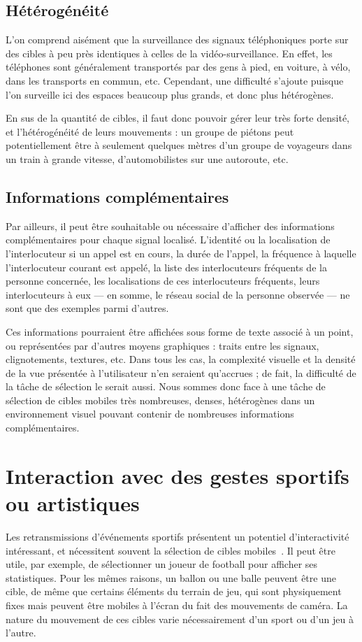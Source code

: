 	\FloatBarrier \subsection{Hétérogénéité}
	L'on comprend aisément que la surveillance des signaux téléphoniques porte sur des cibles à peu près identiques à celles de la vidéo-surveillance. En effet, les téléphones sont généralement transportés par des gens à pied, en voiture, à vélo, dans les transports en commun, etc. Cependant, une difficulté s'ajoute puisque l'on surveille ici des espaces beaucoup plus grands, et donc plus hétérogènes.
	
	En sus de la quantité de cibles, il faut donc pouvoir gérer leur très forte densité, et l'hétérogénéité de leurs mouvements : un groupe de piétons peut potentiellement être à seulement quelques mètres d'un groupe de voyageurs dans un train à grande vitesse, d'automobilistes sur une autoroute, etc.
	
	\FloatBarrier \subsection{Informations complémentaires}
	Par ailleurs, il peut être souhaitable ou nécessaire d'afficher des informations complémentaires pour chaque signal localisé. L'identité ou la localisation de l'interlocuteur si un appel est en cours, la durée de l'appel, la fréquence à laquelle l'interlocuteur courant est appelé, la liste des interlocuteurs fréquents de la personne concernée, les localisations de ces interlocuteurs fréquents, leurs interlocuteurs à eux — en somme, le réseau social de la personne observée — ne sont que des exemples parmi d'autres.
	
	Ces informations pourraient être affichées sous forme de texte associé à un point, ou représentées par d'autres moyens graphiques : traits entre les signaux, clignotements, textures, etc. Dans tous les cas, la complexité visuelle et la densité de la vue présentée à l'utilisateur n'en seraient qu'accrues ; de fait, la difficulté de la tâche de sélection le serait aussi. Nous sommes donc face à une tâche de sélection de cibles mobiles très nombreuses, denses, hétérogènes dans un environnement visuel pouvant contenir de nombreuses informations complémentaires.
	
	\section{Interaction avec des gestes sportifs ou artistiques}	
	Les retransmissions d'événements sportifs présentent un potentiel d'interactivité intéressant, et nécessitent souvent la sélection de cibles mobiles~\cite{ilich2010moving}. Il peut être utile, par exemple, de sélectionner un joueur de football pour afficher ses statistiques. Pour les mêmes raisons, un ballon ou une balle peuvent être une cible, de même que certains éléments du terrain de jeu, qui sont physiquement fixes mais peuvent être mobiles à l'écran du fait des mouvements de caméra. La nature du mouvement de ces cibles varie nécessairement d'un sport ou d'un jeu à l'autre.
	
